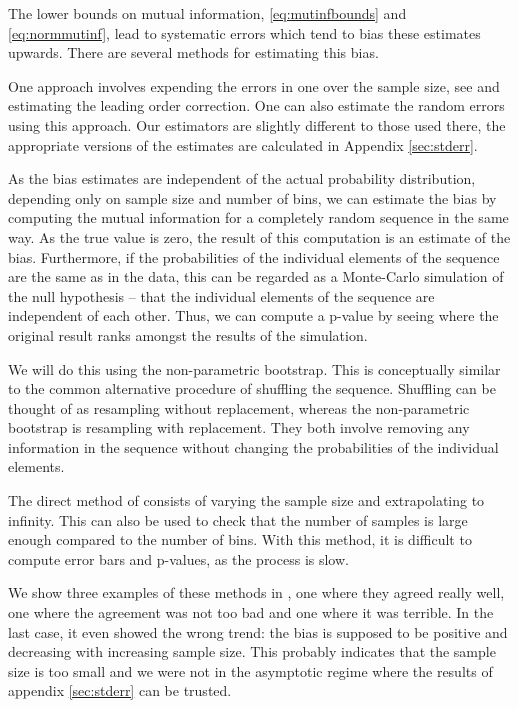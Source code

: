 \documentclass[12pt]{article}
\begin{document}
The lower bounds on mutual information, \eqref{eq:mutinfbounds} and \eqref{eq:normmutinf}, lead to systematic errors which tend to bias these estimates upwards. There are several methods for estimating this bias.

One approach involves expending the errors in one over the sample size, see \cite{1999PhyD..125..285R} and estimating the leading order correction. One can also estimate the random errors using this approach. Our estimators are slightly different to those used there, the appropriate versions of the estimates are calculated in Appendix \ref{sec:stderr}.

As the bias estimates are independent of the actual probability distribution, depending only on sample size and number of bins, we can estimate the bias by computing the mutual information for a completely random sequence in the same way. As the true value is zero, the result of this computation is an estimate of the bias. Furthermore, if the probabilities of the individual elements of the sequence are the same as in the data, this can be regarded as a Monte-Carlo simulation of the null hypothesis -- that the individual elements of the sequence are independent of each other. Thus, we can compute a p-value by seeing where the original result ranks amongst the results of the simulation.

We will do this using the non-parametric bootstrap. This is conceptually similar to the common alternative procedure of shuffling the sequence. Shuffling can be thought of as resampling without replacement, whereas the non-parametric bootstrap is resampling with replacement. They both involve removing any information in the sequence without changing the probabilities of the individual elements.

The direct method of \cite{1998PhRvL..80..197S} consists of varying the sample size and extrapolating to infinity. This can also be used to check that the number of samples is large enough compared to the number of bins. With this method, it is difficult to compute error bars and p-values, as the process is slow.

We show three examples of these methods in , one where they agreed really well, one where the agreement was not too bad and one where it was terrible. In the last case, it even showed the wrong trend: the bias is supposed to be positive and decreasing with increasing sample size. This probably indicates that the sample size is too small and we were not in the asymptotic regime where the results of appendix \ref{sec:stderr} can be trusted.
\end{document}
